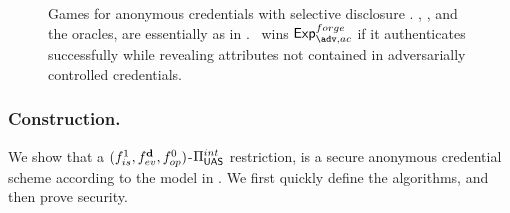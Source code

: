 \begin{figure}[ht!]
  \centering
  \caption{Games for anonymous credentials with selective disclosure
    \cite{fhs19}. \OWNR, \ATTR, and the oracles, are essentially as in
    \UAS. \adv~wins $\Exp^{forge}_{\adv,ac}$ if it authenticates successfully
    while revealing attributes not contained in adversarially controlled
    credentials.}
  \label{fig:model-ac}  
\end{figure}

\subsubsection{\CUASAC Construction.} %
We show that a $(f_{is}^1,f_{ev}^{\mathbf{d}},f_{op}^0)$-$\Pi_{\mathsf{UAS}}^{int}$
restriction, is a secure anonymous credential scheme according to the model in
\cite{fhs19}. We first quickly define the algorithms, and then prove security.

